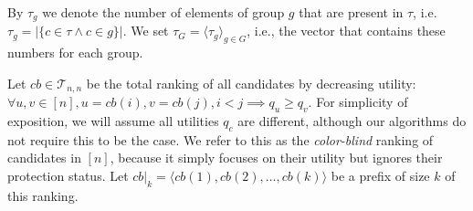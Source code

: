 By $\tau_g$ we denote the number of elements of group $ g $ that are present in $\tau$, i.e. $\tau_g = | \{ c \in \tau \wedge c \in g \} |$.
%
We set $ \tau_G = \langle\tau_g\rangle_{g \in G}$, i.e., the vector that contains these numbers for each group.
%

Let $cb \in {\mathcal T}_{n,n}$ be the total ranking of all candidates by decreasing utility: $\forall u,v \in [n], u=cb(i), v = cb(j), i < j \implies q_u \ge q_v$.
%
For simplicity of exposition, we will assume all utilities $q_c$ are different, although our algorithms do not require this to be the case.
%
We refer to this as the \emph{color-blind} ranking of candidates in $[n]$, because it simply focuses on their utility but ignores their protection status.
%
Let $\textit{cb}|_k = \langle \textit{cb}(1), \textit{cb}(2), \ldots, \textit{cb}(k) \rangle$ be a prefix of size $k$ of this ranking. \label{concept:color-blind-ranking}
%

